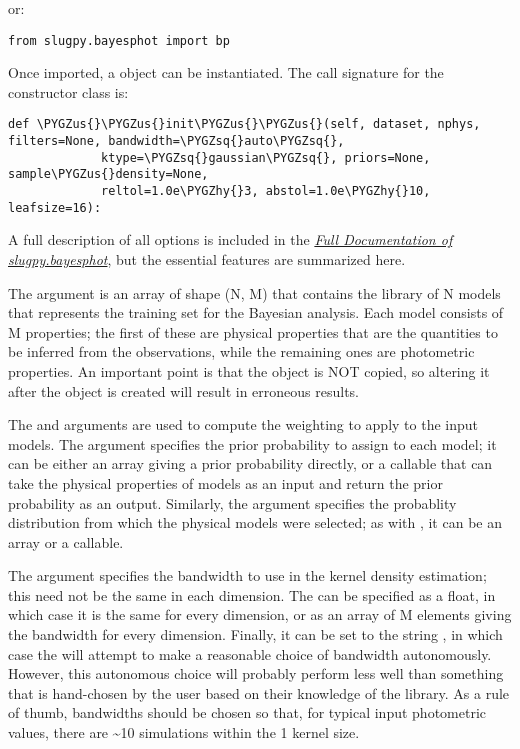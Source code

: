 \documentclass[letterpaper,10pt,english]{sphinxmanual}
\def\PYGZus{\char`\_}
\def\PYGZhy{\char`\-}
\def\PYGZsq{\char`\'}
\renewcommand\PYGZsq{\textquotesingle}
\begin{document}
or:

\begin{Verbatim}[commandchars=\\\{\}]
from slugpy.bayesphot import bp
\end{Verbatim}

Once imported, a  object can be instantiated. The call signature for the  constructor class is:

\begin{Verbatim}[commandchars=\\\{\}]
def \PYGZus{}\PYGZus{}init\PYGZus{}\PYGZus{}(self, dataset, nphys, filters=None, bandwidth=\PYGZsq{}auto\PYGZsq{},
             ktype=\PYGZsq{}gaussian\PYGZsq{}, priors=None, sample\PYGZus{}density=None,
             reltol=1.0e\PYGZhy{}3, abstol=1.0e\PYGZhy{}10, leafsize=16):
\end{Verbatim}

A full description of all options is included in the {\hyperref[bayesphot:ssec\string-slugpy\string-bayesphot]{\emph{Full Documentation of slugpy.bayesphot}}}, but the essential features are summarized here.

The argument  is an array of shape (N, M) that contains the library of N models that represents the training set for the Bayesian analysis. Each model consists of M properties; the first  of these are physical properties that are the quantities to be inferred from the observations, while the remaining ones are photometric properties. An important point is that the  object is NOT copied, so altering it after the  object is created will result in erroneous results.

The  and  arguments are used to compute the weighting to apply to the input models. The  argument specifies the prior probability to assign to each model; it can be either an array giving a prior probability directly, or a callable that can take the physical properties of models as an input and return the prior probability as an output. Similarly, the  argument specifies the probablity distribution from which the physical models were selected; as with , it can be an array or a callable.

The  argument specifies the bandwidth to use in the kernel density estimation; this need not be the same in each dimension. The  can be specified as a float, in which case it is the same for every dimension, or as an array of M elements giving the bandwidth for every dimension. Finally, it can be set to the string , in which case the  will attempt to make a reasonable choice of bandwidth autonomously. However, this autonomous choice will probably perform less well than something that is hand-chosen by the user based on their knowledge of the library. As a rule of thumb, bandwidths should be chosen so that, for typical input photometric values, there are \textasciitilde{}10 simulations within the 1 kernel size.
\end{document}
